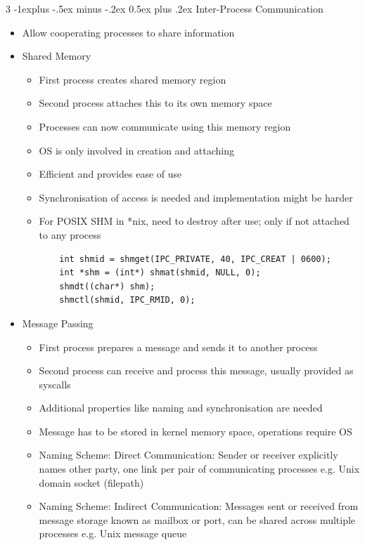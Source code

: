 \documentclass[10pt, landscape]{article}
\makeatletter
\renewcommand{\section}{\@startsection{section}{1}{0mm}%
                                {-1ex plus -.5ex minus -.2ex}%
                                {0.5ex plus .2ex}%
                                {\normalfont\large\bfseries}}
\renewcommand{\section}{\@startsection{section}{2}{0mm}%
                                {-1explus -.5ex minus -.2ex}%
                                {0.5ex plus .2ex}%
                                {\normalfont\normalsize\bfseries}}
\makeatother
\begin{document}
\begin{multicols*}{3}
\section{Inter-Process Communication}
\begin{itemize}
    \item Allow cooperating processes to share information
    \item Shared Memory
    \begin{itemize}
        \item First process creates shared memory region
        \item Second process attaches this to its own memory space
        \item Processes can now communicate using this memory region
        \item OS is only involved in creation and attaching
        \item Efficient and provides ease of use
        \item Synchronisation of access is needed and implementation might be harder
        \item For POSIX SHM in *nix, need to destroy after use; only if not attached to any process
        \begin{verbatim}
    int shmid = shmget(IPC_PRIVATE, 40, IPC_CREAT | 0600);
    int *shm = (int*) shmat(shmid, NULL, 0);
    shmdt((char*) shm);
    shmctl(shmid, IPC_RMID, 0);
        \end{verbatim}
    \end{itemize}
    \item Message Passing
    \begin{itemize}
        \item First process prepares a message and sends it to another process
        \item Second process can receive and process this message, usually provided as syscalls
        \item Additional properties like naming and synchronisation are needed
        \item Message has to be stored in kernel memory space, operations require OS
        \item Naming Scheme: Direct Communication: Sender or receiver explicitly names other party, one link per pair of communicating processes e.g. Unix domain socket (filepath)
        \item Naming Scheme: Indirect Communication: Messages sent or received from message storage known as mailbox or port, can be shared across multiple processes e.g. Unix message queue

\end{itemize}
\end{itemize}
\end{multicols*}
\end{document}
